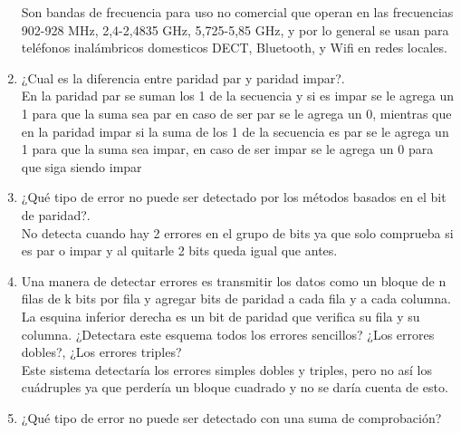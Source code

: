 \documentclass{udparticle}
\begin{document}
\begin{enumerate}
Son bandas de frecuencia para uso no comercial que operan en las frecuencias 902-928 MHz, 2,4-2,4835 GHz, 5,725-5,85 GHz, y por lo general se usan para teléfonos inalámbricos domesticos DECT, Bluetooth, y Wifi en redes locales.\\
\item  ¿Cual es la diferencia entre paridad par y paridad impar?.\\
En la paridad par se suman los 1 de la secuencia y si es impar se le agrega un 1 para que la suma sea par en caso de ser par se le agrega un 0, mientras que en la paridad impar si la suma de los 1 de la secuencia es par se le agrega un 1 para que la suma sea impar, en caso de ser impar se le agrega un 0 para que siga siendo impar\\
\item ¿Qué tipo de error no puede ser detectado por los métodos basados en el bit de paridad?.\\
No detecta cuando hay 2 errores en el grupo de bits ya que solo comprueba si es par o impar y al quitarle 2 bits queda igual que antes.\\
\item Una manera de detectar errores es transmitir los datos como un bloque de n filas de k bits por fila y agregar bits de paridad a cada fila y a cada columna. La esquina inferior derecha es un bit de paridad que verifica su fila y su columna. ¿Detectara este esquema todos los errores sencillos? ¿Los errores dobles?, ¿Los errores triples?\\
Este sistema detectaría los errores simples dobles y triples, pero no así los cuádruples ya que perdería un bloque cuadrado y no se daría cuenta de esto.\\
\item  ¿Qué tipo de error no puede ser detectado con una suma de comprobación?\\



  
  
    
    
\end{enumerate}
\end{document}
